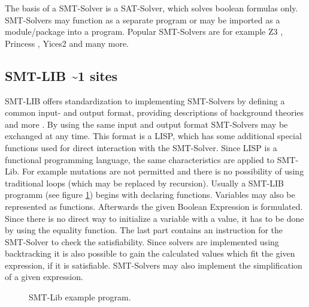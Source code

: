 The basis of a SMT-Solver is a SAT-Solver, which solves boolean formulas only. SMT-Solvers may function as a separate program or may be imported as a module/package into a program. 
Popular SMT-Solvers are for example Z3 \cite{demouraZ3EfficientSMT2008}, Princess \cite{princess08}, Yices2 \cite{Dutertre:cav2014} and many more.

\subsection{SMT-LIB \textasciitilde 1 sites}
SMT-LIB offers standardization to implementing SMT-Solvers by defining a common input- and output format, providing descriptions of background theories and more \cite{cokSMTLIBv2LanguageTools}. %
By using the same input and output format SMT-Solvers may be exchanged at any time. 
This format is a LISP, which has some additional special functions used for direct interaction with the SMT-Solver. Since LISP is a functional programming language, the same characteristics are applied to SMT-Lib.
For example mutations are not permitted and there is no possibility of using traditional loops (which may be replaced by recursion).
Usually a SMT-LIB programm (see figure \ref{code:smt-lib}) begins with declaring functions. Variables may also be represented as functions. 
Afterwards the given Boolean Expression is formulated. Since there is no direct way to initialize a variable with a value, it has to be done by using the equality function. 
The last part contains an instruction for the SMT-Solver to check the satisfiability. 
Since solvers are implemented using backtracking it is also possible to gain the calculated values which fit the given expression, if it is satisfiable. 
SMT-Solvers may also implement the simplification of a given expression.

\begin{figure}
	\begin{GenericCode}
	\end{GenericCode}
	\caption{SMT-Lib example program.}
	\label{code:smt-lib}
\end{figure}



